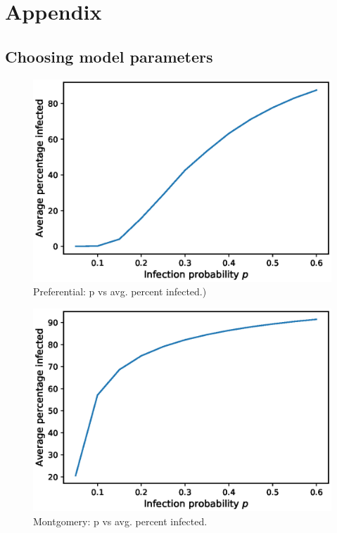 \section{Appendix}
\label{appendix}

\subsection{Choosing model parameters}

\begin{figure}[!h]
    \centering
    \includegraphics[scale = 0.55]{Figuresnew/PA_attackrates.eps}
    \caption{Preferential: p vs avg. percent infected.)}
    \label{fig:PA_ar}
\end{figure}

\begin{figure}[!h]
    \centering
    \includegraphics[scale = 0.55]{Figuresnew/montgo_attackrates.eps}
    \caption{Montgomery: p vs avg. percent infected.}
    \label{fig:montgo_ar}
\end{figure}



